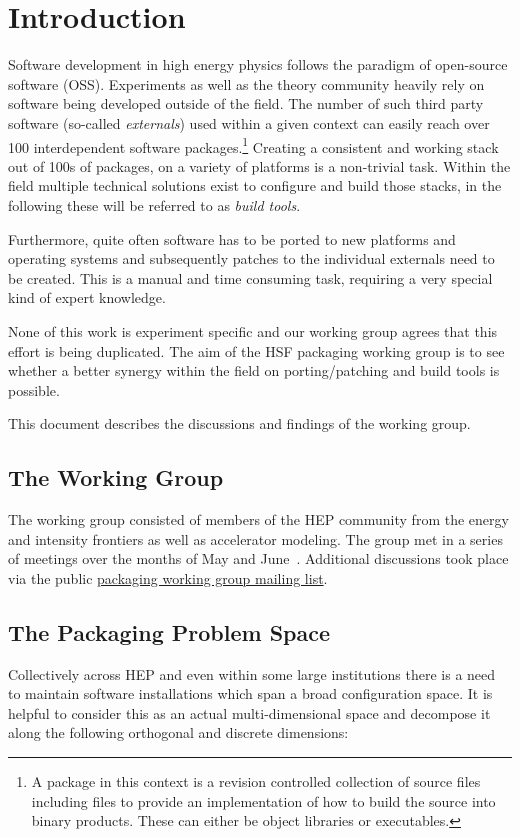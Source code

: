 \documentclass[12pt,a4paper]{article}
\begin{document}
\section{Introduction}

Software development in high energy physics follows the paradigm of open-source software (OSS). Experiments as well as the theory community heavily rely on software being developed outside of the field. The number of such third party software (so-called \emph{externals}) used within a given context can easily reach over 100 interdependent software packages.\footnote{ A package in this context is a revision controlled collection of source files including files to provide an implementation of how to build the source into binary products. These can either be object libraries or executables.}
Creating a consistent and working stack out of 100s of packages, on a variety of platforms is a non-trivial task. Within the field multiple technical solutions exist to configure and build those stacks, in the following these will be referred to as \emph{build tools}. 

Furthermore, quite often software has to be ported to new platforms and operating systems and subsequently patches to the individual externals need to be created. This is a manual and time consuming task, requiring a very special kind of expert knowledge.

None of this work is experiment specific and our working group agrees that this effort is being duplicated. The aim of the HSF packaging working group is to see whether a better synergy within the field on porting/patching and build tools is possible. 

This document describes the discussions and findings of the working group.
\subsection{The Working Group}
The working group consisted of members of the HEP community from the energy and intensity frontiers as well as accelerator modeling. The group met in a series of meetings over the months of May and June~\cite{meetings}.
Additional discussions took place via the public \href{https://groups.google.com/forum/#!forum/hep-sf-packaging-wg}{packaging working group mailing list}.
\subsection{The Packaging Problem Space}
Collectively across HEP and even within some large institutions there is
a need to maintain software installations which span a broad
configuration space.  It is helpful to consider this as an actual
multi-dimensional space and decompose it along the following orthogonal
and discrete dimensions:
\end{document}
